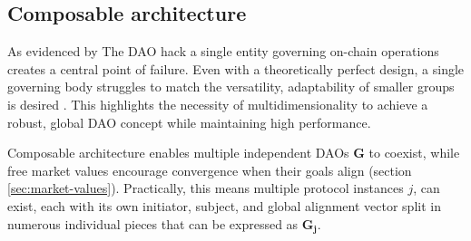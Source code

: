 \documentclass{article}
\begin{document}
\begin{CJK}{UTF8}{gbsn}
\begin{multicols}{2}
        \subsection{Composable architecture}
        As evidenced by The DAO hack\cite{Liu2021} a single entity governing on-chain operations creates a central point of failure. Even with a theoretically perfect design, a single governing body struggles to match the versatility, adaptability of smaller groups is desired \cite{Buterin22}.  This highlights the necessity of multidimensionality to achieve a robust, global DAO concept while maintaining high performance.

        Composable architecture enables multiple independent DAOs $\mathbf{G}$ to coexist, while free market values encourage convergence when their goals align (section \ref{sec:market-values}). Practically, this means multiple protocol instances $j$, can exist, each with its own initiator, subject, and global alignment vector split in numerous individual pieces that can be expressed as $\mathbf{G_j}$. \\


\end{multicols}
\end{CJK}
\end{document}
